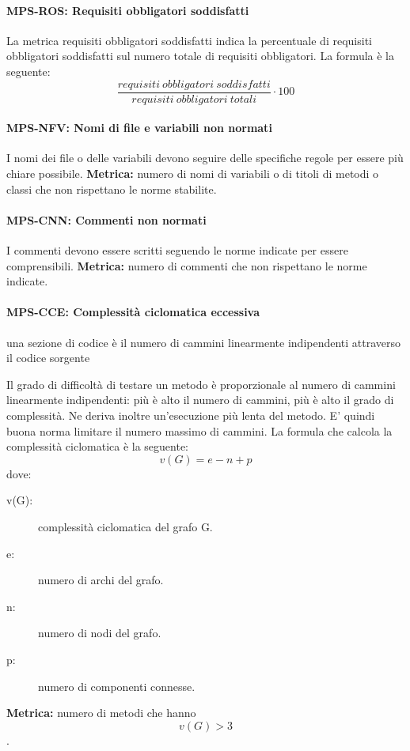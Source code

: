 \documentclass[../../norme-di-progetto.tex]{subfiles}
\begin{document}
\paragraph{MPS-ROS: Requisiti obbligatori soddisfatti}%
\label{par:MPS-ROS_requisiti_obbligatori_soddisfatti}

La metrica requisiti obbligatori soddisfatti indica la percentuale di requisiti obbligatori soddisfatti sul numero totale di requisiti obbligatori. La formula è la seguente:
\[
  \frac{requisiti\ obbligatori\ soddisfatti}{requisiti\ obbligatori\ totali}\cdot 100
\]
\paragraph{MPS-NFV: Nomi di file e variabili non normati}
\label{par:MPS-NFV_nomi_file_variabili_non_normati}

I nomi dei file o delle variabili devono seguire delle specifiche regole per essere più chiare possibile.
\textbf{Metrica:} numero di nomi di variabili o di titoli di metodi o classi che non rispettano le norme stabilite.

\paragraph{MPS-CNN: Commenti non normati}
\label{par:MPS-CNN_commenti_non_normati}

I commenti devono essere scritti seguendo le norme indicate per essere comprensibili.
\textbf{Metrica:} numero di commenti che non rispettano le norme indicate.

\paragraph{MPS-CCE: Complessità ciclomatica eccessiva}
\label{par:MPS-CCE_complessita_ciclomatica_eccessiva}
una sezione di codice è il numero di cammini linearmente indipendenti attraverso il codice sorgente

Il grado di difficoltà di testare un metodo è proporzionale al numero di cammini linearmente indipendenti: più è alto il numero di cammini, più è alto il grado di complessità.
Ne deriva inoltre un'esecuzione più lenta del metodo. E' quindi buona norma limitare il numero massimo di cammini.
La formula che calcola la complessità ciclomatica è la seguente:
\[
  v(G) = e - n + p
\]
dove:
\begin{description}
  \item[v(G):] complessità ciclomatica del grafo G.
  \item[e:] numero di archi del grafo.
  \item[n:] numero di nodi del grafo.
  \item[p:] numero di componenti connesse.
\end{description}
\textbf{Metrica:} numero di metodi che hanno \[v(G) > 3\].
\end{document}
